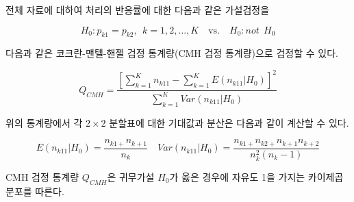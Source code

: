 \documentclass[
]{book}
\theoremstyle{definition}
\theoremstyle{definition}
\theoremstyle{definition}
\theoremstyle{definition}
\theoremstyle{remark}
\begin{document}
전체 자료에 대하여 처리의 반응률에 대한 다음과 같은 가설검정을

\[ H_0: p_{k1} = p_{k2}, ~~k=1,2,\dots,K \quad \text{vs.} \quad H_0: not~~ H_0 \]

다음과 같은 코크란-맨텔-핸젤 검정 통계량(CMH 검정 통계량)으로 검정할 수 있다.

\[ Q_{CMH} = \frac { [ \sum_{k=1}^ K n_{k11} - \sum_{k=1}^K E(n_{k11}|H_0)]^2} { \sum_{k=1}^K Var(n_{k11}|H_0)} \]

위의 통계량에서 각 \(2 \times 2\) 분할표에 대한 기대값과 분산은 다음과 같이 계산할 수 있다.

\[  E(n_{k11}|H_0) = \frac{n_{k1+} n_{k+1}}{n_k} \quad
Var(n_{k11}|H_0) = \frac{n_{k1+}n_{k2+} n_{k+1}n_{k+2}}{n^2_k(n_k-1)} \]

CMH 검정 통계량 \(Q_{CMH}\)은 귀무가설 \(H_0\)가 옳은 경우에 자유도 1을 가지는 카이제곱 분포를 따른다.

\backmatter

  
\end{document}
